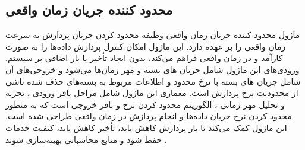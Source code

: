 \subsection{محدود کننده جریان زمان واقعی \protect{}}
ماژول محدود کننده جریان زمان واقعی وظیفه محدود کردن جریان پردازش به سرعت زمان واقعی را بر عهده دارد. این ماژول امکان کنترل پردازش داده‌ها را به صورت کارآمد و در زمان واقعی فراهم می‌کند، بدون ایجاد تأخیر یا بار اضافی 
بر سیستم. ورودی‌های این ماژول شامل جریان های بسته  و مهر زمان‌ها  می‌شود و خروجی‌های آن شامل جریان های بسته با نرخ محدود  و اطلاعات مربوط به 
بسته‌های حذف شده ناشی از محدودیت نرخ پردازش است. معماری این ماژول شامل مراحل بافر ورودی  ، تجزیه و تحلیل مهر زمانی ، الگوریتم محدود کردن نرخ   و
بافر خروجی   است که به منظور محدود کردن نرخ جریان داده‌ها و انجام پردازش در زمان واقعی طراحی شده است. این ماژول کمک می‌کند تا بار پردازش کاهش یابد، تأخیر کاهش یابد، کیفیت خدمات حفظ شود و منابع محاسباتی بهینه‌سازی شوند .

\cite{zhang2020mediapipe}



